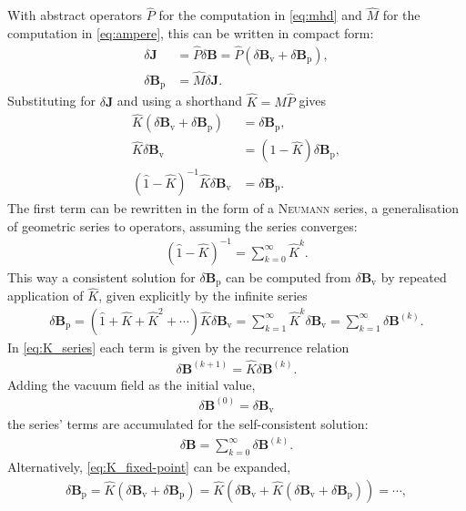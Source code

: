 \documentclass[a4paper, twoside, 10pt, english]{article}
\numberwithin{equation}{section}
\let\vec\symbf
\newcommand*\Bvac{\ensuremath{\delta \vec{B}_{\text{v}}}}  %
\newcommand*\Bplas{\ensuremath{\delta \vec{B}_{\text{p}}}}  %
\newcommand*\Bpert{\ensuremath{\delta \vec{B}}}  %
\begin{document}
With abstract operators $\hat{P}$ for the computation in \cref{eq:mhd} and $\hat{M}$ for the computation in \cref{eq:ampere}, this can be written in compact form:
\begin{align}
  \delta \vec{J} &= \hat{P} \Bpert = \hat{P} \left ( \Bvac + \Bplas \right ), \\
  \Bplas &= \hat{M} \delta \vec{J}.
\end{align}
Substituting for $\delta \vec{J}$ and using a shorthand $\hat{K} = \hat{M} \hat{P}$ gives
\begin{align}
  \hat{K} \left ( \Bvac + \Bplas \right ) &= \Bplas, \label{eq:K_fixed-point} \\
  \hat{K} \Bvac &= \left ( \hat{1} - \hat{K} \right ) \Bplas, \\
  \left ( \hat{1} - \hat{K} \right )^{-1} \hat{K} \Bvac &= \Bplas.
\end{align}
The first term can be rewritten in the form of a \textsc{Neumann} series, a generalisation of geometric series to operators, assuming the series converges:
\begin{gather}
  \left ( \hat{1} - \hat{K} \right )^{-1} = \sum_{k = 0}^{\infty} \hat{K}^{k}. \label{eq:Neumann_series}
\end{gather}
This way a consistent solution for $\Bplas$ can be computed from $\Bvac$ by repeated application of $\hat{K}$, given explicitly by the infinite series
\begin{gather}
  \Bplas = \left ( \hat{1} + \hat{K} + \hat{K}^{2} + \dotsb \right ) \hat{K} \Bvac = \sum_{k = 1}^{\infty} \hat{K}^{k} \Bvac = \sum_{k = 1}^{\infty} \Bpert^{(k)}. \label{eq:K_series}
\end{gather}
In \cref{eq:K_series} each term is given by the recurrence relation
\begin{gather}
  \Bpert^{(k+1)} = \hat{K} \Bpert^{(k)}.
\end{gather}
Adding the vacuum field as the initial value,
\begin{gather}
  \Bpert^{(0)} = \Bvac
\end{gather}
the series' terms are accumulated for the self-consistent solution:
\begin{gather}
  \Bpert = \sum_{k = 0}^{\infty} \Bpert^{(k)}.
\end{gather}
Alternatively, \cref{eq:K_fixed-point} can be expanded,
\begin{gather}
  \Bplas = \hat{K} \left ( \Bvac + \Bplas \right ) = \hat{K} \left ( \Bvac + \hat{K} \left ( \Bvac + \Bplas \right ) \right ) = \dotsb,
\end{gather}
\end{document}

